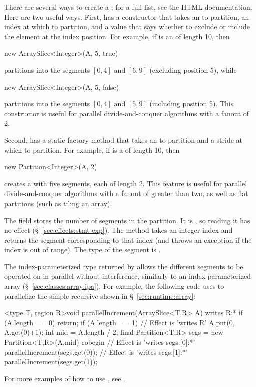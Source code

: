  There are several ways to
create a ; for a full list, see the HTML
documentation.  Here are two useful ways.  First, 
has a constructor that takes an  to partition, an index
at which to partition, and a  value that says whether to
exclude or include the element at the index position.  For example, if
 is an  of length 10, then
%
\begin{dpjlisting}
new ArraySlice<Integer>(A, 5, true)
\end{dpjlisting}
%
partitions  into the segments $[0,4]$ and $[6,9]$ (excluding
position 5), while
%
\begin{dpjlisting}
new ArraySlice<Integer>(A, 5, false)
\end{dpjlisting}
%
partitions  into the segments $[0,4]$ and $[5,9]$ (including
position 5).  This constructor is useful for parallel
divide-and-conquer algorithms with a fanout of 2.

Second,  has a static factory method
 that takes an  to partition and a
stride at which to partition.  For example, if  is a
 of length 10, then
%
\begin{dpjlisting}
new Partition<Integer>(A, 2)
\end{dpjlisting}
%
creates a  with five segments, each of
length 2.  This feature is useful for parallel divide-and-conquer
algorithms with a fanout of greater than two, as well as flat
partitions (such as tiling an array).

 The field  stores the number
of segments in the partition.  It is , so reading it has no
effect (\S~\ref{sec:effects:stmt-exp}).  The method  takes an
integer index  and returns the segment corresponding to that
index (and throws an exception if the index is out of range).  The
type of the segment is .

The index-parameterized type returned by  allows the
different segments to be operated on in parallel without interference,
similarly to an index-parameterized array
(\S~\ref{sec:classes:array:ipa}).  For example, the following code uses
 to parallelize the simple recursive 
shown in \S~\ref{sec:runtime:array}:
%
\begin{dpjlisting}
<type T, region R>void parallelIncrement(ArraySlice<T,R> A) 
  writes R:* 
{
  if (A.length == 0) return;
  if (A.length == 1) {
    // Effect is 'writes R'
    A.put(0, A.get(0)+1);
  }
  int mid = A.length / 2;
  final Partition<T,R> segs = new Partition<T,R>(A,mid)
  cobegin {
    // Effect is 'writes segs:[0]:*'
    parallelIncrement(segs.get(0));
    // Effect is 'writes segs:[1]:*'
    parallelIncrement(segs.get(1));
  }
}
\end{dpjlisting}
%
For more examples of how to use , see \tutorial.

